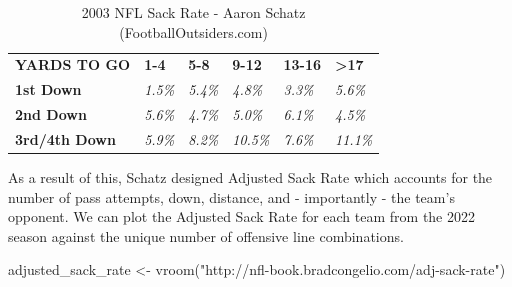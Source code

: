 \documentclass[
  letterpaper,
]{krantz}
\newenvironment{Shaded}{\begin{snugshade}}{\end{snugshade}}
\newcommand{\FunctionTok}[1]{\textcolor[rgb]{0.28,0.35,0.67}{#1}}
\newcommand{\NormalTok}[1]{\textcolor[rgb]{0.00,0.23,0.31}{#1}}
\newcommand{\OtherTok}[1]{\textcolor[rgb]{0.00,0.23,0.31}{#1}}
\newcommand{\StringTok}[1]{\textcolor[rgb]{0.13,0.47,0.30}{#1}}
\begin{document}
\begin{longtable}[]{@{}
  >{\centering\arraybackslash}p{}
  >{\raggedright\arraybackslash}p{}
  >{\raggedright\arraybackslash}p{}
  >{\raggedright\arraybackslash}p{}
  >{\raggedright\arraybackslash}p{}
  >{\raggedright\arraybackslash}p{}@{}}
\caption{2003 NFL Sack Rate - Aaron Schatz
(FootballOutsiders.com)}\tabularnewline
\toprule\noalign{}
\endfirsthead
\endhead
\bottomrule\noalign{}
\endlastfoot
\textbf{YARDS TO GO} & \textbf{1-4} & \textbf{5-8} & \textbf{9-12} &
\textbf{13-16} & \textbf{\textgreater17} \\
\textbf{1st Down} & \emph{1.5\%} & \emph{5.4\%} & \emph{4.8\%} &
\emph{3.3\%} & \emph{5.6\%} \\
\textbf{2nd Down} & \emph{5.6\%} & \emph{4.7\%} & \emph{5.0\%} &
\emph{6.1\%} & \emph{4.5\%} \\
\textbf{3rd/4th Down} & \emph{5.9\%} & \emph{8.2\%} & \emph{10.5\%} &
\emph{7.6\%} & \emph{11.1\%} \\
\end{longtable}

As a result of this, Schatz designed Adjusted Sack Rate which accounts
for the number of pass attempts, down, distance, and - importantly - the
team's opponent. We can plot the Adjusted Sack Rate for each team from
the 2022 season against the unique number of offensive line
combinations.

\begin{Shaded}
\begin{Highlighting}[]
\NormalTok{adjusted\_sack\_rate }\OtherTok{\textless{}{-}} \FunctionTok{vroom}\NormalTok{(}\StringTok{"http://nfl{-}book.bradcongelio.com/adj{-}sack{-}rate"}\NormalTok{)}
\end{Highlighting}
\end{Shaded}
\end{document}
